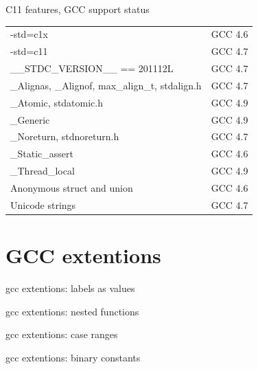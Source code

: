 %    
\begin{frame}{C11 features, GCC support status}
    \begin{center}
        \begin{tabular}{lc}
            -std=c1x & GCC 4.6 \\
            -std=c11 & GCC 4.7 \\
            \_\_STDC\_VERSION\_\_ == 201112L & GCC 4.7 \\
            \_Alignas, \_Alignof, max\_align\_t, stdalign.h & GCC 4.7 \\
            \_Atomic, stdatomic.h & GCC 4.9 \\
            \_Generic & GCC 4.9 \\
            \_Noreturn, stdnoreturn.h & GCC 4.7 \\
            \_Static\_assert & GCC 4.6 \\
            \_Thread\_local & GCC 4.9 \\
            Anonymous struct and union & GCC 4.6 \\
            Unicode strings & GCC 4.7 \\
        \end{tabular}
    \end{center}
\end{frame}
\section{GCC extentions}
\begin{frame}{gcc extentions: labels as values}
    
\end{frame}
\begin{frame}{gcc extentions: nested functions}
    
\end{frame}
\begin{frame}{gcc extentions: case ranges}
    
\end{frame}
\begin{frame}{gcc extentions: binary constants}
    
\end{frame}

